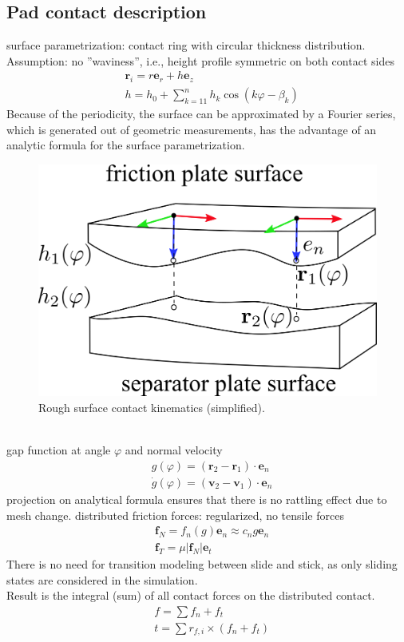 \documentclass[a4paper,fleqn]{cas-dc}
\begin{document}
\subsection{Pad contact description}
surface parametrization: contact ring with circular thickness distribution. Assumption: no ''waviness'', i.e., height profile symmetric on both contact sides
\begin{align}
	& \boldsymbol{r}_i = r\boldsymbol{e}_r + h\boldsymbol{e}_z\\
	& h = h_0 + \sum_{k=11}^{n}h_k \cos\left(k\varphi-\beta_k\right) 
\end{align}
Because of the periodicity, the surface can be approximated by a Fourier series, which is generated out of geometric measurements, has the advantage of an analytic formula for the surface parametrization. 
\begin{figure}
	\centering
	\includegraphics[scale=.75]{figs/roughsurf.png}
	\caption{Rough surface contact kinematics (simplified). }
	\label{fig:roughsurf}
\end{figure}\\
gap function \cite{willner2013kontinuums} at angle $\varphi$ and normal velocity
\begin{align}
	& g(\varphi) = \left(\boldsymbol{r}_2-\boldsymbol{r}_1\right)\cdot \boldsymbol{e}_n\\
	& \dot g(\varphi) = \left(\boldsymbol{v}_2-\boldsymbol{v}_1\right)\cdot \boldsymbol{e}_n	
\end{align}
projection on analytical formula ensures that there is no rattling effect due to mesh change. distributed friction forces: regularized, no tensile forces 
\begin{align}
&\boldsymbol{f}_{N} = f_n(g) \boldsymbol{e}_n\approx c_n g\boldsymbol{e}_n\\
&\boldsymbol{f}_{T} = \mu |\boldsymbol f_N| \boldsymbol{e}_t
\end{align}
There is no need for transition modeling between slide and stick, as only sliding states are considered in the simulation. \\
Result is the integral (sum) of all contact forces on the distributed contact. 
\begin{align}
& f = \sum f_n + f_t\\
& t = \sum r_{f,i}\times \left(f_n + f_t\right)
\end{align}
\end{document}
